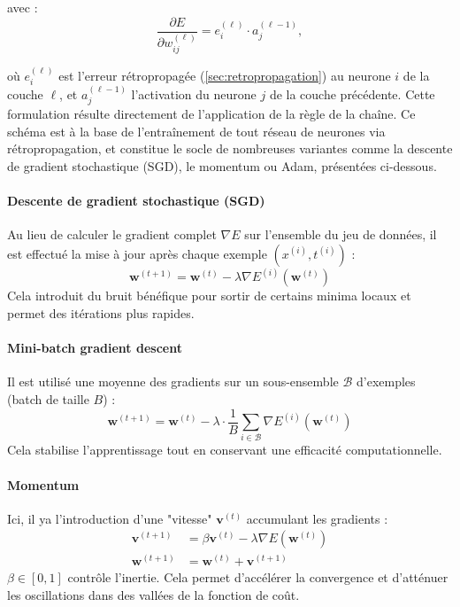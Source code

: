 avec :
\begin{equation}
    \frac{\partial E}{\partial w_{ij}^{(\ell)}} = e_i^{(\ell)} \cdot a_j^{(\ell-1)},
\end{equation}

où \( e_i^{(\ell)} \) est l’erreur rétropropagée (\autoref{sec:retropropagation}) au neurone \( i \) de la couche \( \ell \), et \( a_j^{(\ell-1)} \) l’activation du neurone \( j \) de la couche précédente. Cette formulation résulte directement de l'application de la règle de la chaîne. Ce schéma est à la base de l'entraînement de tout réseau de neurones via rétropropagation, et constitue le socle de nombreuses variantes comme la descente de gradient stochastique (SGD), le momentum ou Adam, présentées ci-dessous.

\paragraph{Descente de gradient stochastique (SGD)}
Au lieu de calculer le gradient complet \( \nabla E \) sur l’ensemble du jeu de données, il est effectué la mise à jour après chaque exemple \( (x^{(i)}, t^{(i)}) \) :
\begin{equation}
    \boldsymbol{w}^{(t+1)} = \boldsymbol{w}^{(t)} - \lambda \nabla E^{(i)}(\boldsymbol{w}^{(t)})
\end{equation}
Cela introduit du bruit bénéfique pour sortir de certains minima locaux et permet des itérations plus rapides.

\paragraph{Mini-batch gradient descent}
Il est utilisé une moyenne des gradients sur un sous-ensemble \( \mathcal{B} \) d’exemples (batch de taille \( B \)) :
\begin{equation}
    \boldsymbol{w}^{(t+1)} = \boldsymbol{w}^{(t)} - \lambda \cdot \frac{1}{B} \sum_{i \in \mathcal{B}} \nabla E^{(i)}(\boldsymbol{w}^{(t)})
\end{equation}
Cela stabilise l’apprentissage tout en conservant une efficacité computationnelle.

\paragraph{Momentum}
Ici, il ya l'introduction d'une "vitesse" \( \boldsymbol{v}^{(t)} \) accumulant les gradients :
\begin{align}
    \boldsymbol{v}^{(t+1)} &= \beta \boldsymbol{v}^{(t)} - \lambda \nabla E(\boldsymbol{w}^{(t)}) \\
    \boldsymbol{w}^{(t+1)} &= \boldsymbol{w}^{(t)} + \boldsymbol{v}^{(t+1)}
\end{align}
\( \beta \in [0,1] \) contrôle l’inertie. Cela permet d’accélérer la convergence et d’atténuer les oscillations dans des vallées de la fonction de coût.

